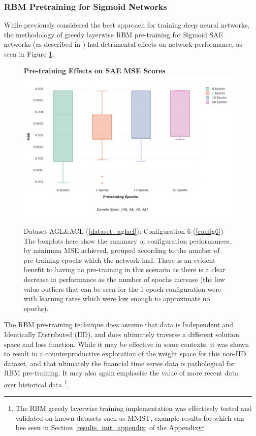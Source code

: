 \documentclass[a4paper,11pt,oneside]{article}
\theoremstyle{plain}
\theoremstyle{definition}
\begin{document}
	\subsubsection{RBM Pretraining for Sigmoid Networks}
	
	While previously considered the best approach for training deep neural networks, the methodology of greedy layerwise RBM pre-training for Sigmoid SAE networks (as described in \citep{Hinton2}) had detrimental effects on network performance, as seen in Figure \ref{figure-results-pretraining-effect}. \newline
	
	\begin{figure}[H]
		\centering
		\textbf{Pre-training Effects on SAE MSE Scores} 
		\includegraphics[scale=0.45]{images/results/newinit/actual_sigmoid_pt.png}
		\caption[Pre-training Effects on SAE MSE Scores]
		{Dataset AGL\&ACL (\ref{dataset_aglacl}); Configuration 6 (\ref{config6})
			\newline \newline The boxplots here show the summary of configuration performances, by minimum MSE achieved, grouped according to the number of pre-training epochs which the network had. There is an evident benefit to having no pre-training in this scenario as there is a clear decrease in performance as the number of epochs increase (the low value outliers that can be seen for the 1 epoch configuration were with learning rates which were low enough to approximate no epochs).}
		\label{figure-results-pretraining-effect}
	\end{figure}		
	
	The RBM pre-training technique does assume that data is Independent and Identically Distributed (IID), and does ultimately traverse a different solution space and loss function. While it may be effective in some contexts, it was shown to result in a counterproductive exploration of the weight space for this non-IID dataset, and that ultimately the financial time series data is pathological for RBM pre-training. It may also again emphasise the value of more recent data over historical data \footnote{The RBM greedy layerwise training implementation was effectively tested and validated on known datasets such as MNIST, example results for which can bee seen in Section \ref{results_init_appendix} of the Appendix}.\newline 
	
\end{document}
